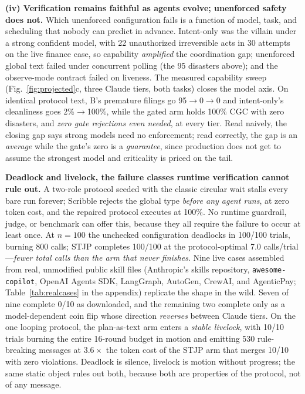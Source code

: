 \documentclass{article}
\newcommand{\stjp}{\textsc{STJP}}
\begin{document}
\textbf{(iv) Verification remains faithful as agents evolve; unenforced safety does not.} Which unenforced configuration fails is a function of model, task, and scheduling that nobody can predict in advance. Intent-only was the villain under a strong confident model, with 22 unauthorized irreversible acts in 30 attempts on the live finance case, so capability \emph{amplified} the coordination gap; unenforced global text failed under concurrent polling (the 95 disasters above); and the observe-mode contract failed on liveness. The measured capability sweep (Fig.~\ref{fig:projected}c, three Claude tiers, both tasks) closes the model axis. On identical protocol text, B's premature filings go 95$\to$0$\to$0 and intent-only's cleanliness goes 2\%$\to$100\%, while the gated arm holds 100\% CGC with zero disasters, and \emph{zero gate rejections even needed}, at every tier. Read naively, the closing gap says strong models need no enforcement; read correctly, the gap is an \emph{average} while the gate's zero is a \emph{guarantee}, since production does not get to assume the strongest model and criticality is priced on the tail.

\textbf{Deadlock and livelock, the failure classes runtime verification cannot rule out.} A two-role protocol seeded with the classic circular wait stalls every bare run forever; Scribble rejects the global type \emph{before any agent runs}, at zero token cost, and the repaired protocol executes at 100\%. No runtime guardrail, judge, or benchmark can offer this, because they all require the failure to occur at least once. At $n{=}100$ the unchecked configuration deadlocks in 100/100 trials, burning 800 calls; \stjp{} completes 100/100 at the protocol-optimal 7.0 calls/trial---\emph{fewer total calls than the arm that never finishes}. Nine live cases assembled from real, unmodified public skill files (Anthropic's skills repository, \texttt{awesome-copilot}, OpenAI Agents SDK, LangGraph, AutoGen, CrewAI, and AgenticPay; Table~\ref{tab:realcases} in the appendix) replicate the shape in the wild. Seven of nine complete 0/10 as downloaded, and the remaining two complete only as a model-dependent coin flip whose direction \emph{reverses} between Claude tiers. On the one looping protocol, the plan-as-text arm enters a \emph{stable livelock}, with 10/10 trials burning the entire 16-round budget in motion and emitting 530 rule-breaking messages at $3.6\times$ the token cost of the \stjp{} arm that merges 10/10 with zero violations. Deadlock is silence, livelock is motion without progress; the same static object rules out both, because both are properties of the protocol, not of any message.
\end{document}
